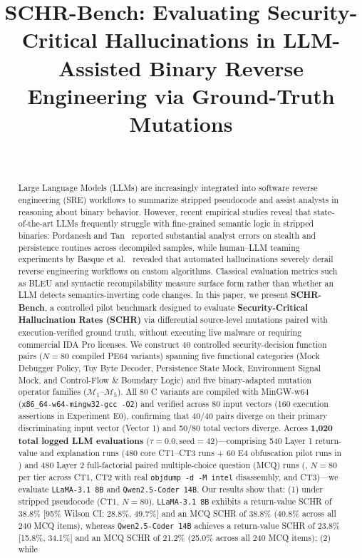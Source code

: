 \documentclass[conference]{IEEEtran}
\begin{document}
\title{SCHR-Bench: Evaluating Security-Critical Hallucinations in LLM-Assisted Binary Reverse Engineering via Ground-Truth Mutations}

\author{\\
}

\maketitle

\begin{abstract}
Large Language Models (LLMs) are increasingly integrated into software reverse engineering (SRE) workflows to summarize stripped pseudocode and assist analysts in reasoning about binary behavior. However, recent empirical studies reveal that state-of-the-art LLMs frequently struggle with fine-grained semantic logic in stripped binaries: Pordanesh and Tan~\cite{pordanesh2024exploring} reported substantial analyst errors on stealth and persistence routines across decompiled samples, while human--LLM teaming experiments by Basque et al.~\cite{basque2026decompiling} revealed that automated hallucinations severely derail reverse engineering workflows on custom algorithms. Classical evaluation metrics such as BLEU and syntactic recompilability measure surface form rather than whether an LLM detects semantics-inverting code changes. In this paper, we present \textbf{SCHR-Bench}, a controlled pilot benchmark designed to evaluate \textbf{Security-Critical Hallucination Rates (SCHR)} via differential source-level mutations paired with execution-verified ground truth, without executing live malware or requiring commercial IDA Pro licenses. We construct 40 controlled security-decision function pairs ($N = 80$ compiled PE64 variants) spanning five functional categories (Mock Debugger Policy, Toy Byte Decoder, Persistence State Mock, Environment Signal Mock, and Control-Flow \& Boundary Logic) and five binary-adapted mutation operator families ($\mathcal{M}_1$--$\mathcal{M}_5$). All 80 C variants are compiled with MinGW-w64 (\texttt{x86\_64-w64-mingw32-gcc -O2}) and verified across 80 input vectors (160 execution assertions in Experiment E0), confirming that 40/40 pairs diverge on their primary discriminating input vector (Vector 1) and 50/80 total vectors diverge. Across \textbf{1,020 total logged LLM evaluations} ($\tau = 0.0, \text{seed} = 42$)---comprising 540 Layer 1 return-value and explanation runs (480 core CT1--CT3 runs + 60 E4 obfuscation pilot runs in ) and 480 Layer 2 full-factorial paired multiple-choice question (MCQ) runs (, $N=80$ per tier across CT1, CT2 with real \texttt{objdump -d -M intel} disassembly, and CT3)---we evaluate \texttt{LLaMA-3.1 8B} and \texttt{Qwen2.5-Coder 14B}. Our results show that: (1) under stripped pseudocode (CT1, $N=80$), \texttt{LLaMA-3.1 8B} exhibits a return-value SCHR of 38.8\% [95\% Wilson CI: 28.8\%, 49.7\%] and an MCQ SCHR of 38.8\% (40.8\% across all 240 MCQ items), whereas \texttt{Qwen2.5-Coder 14B} achieves a return-value SCHR of 23.8\% [15.8\%, 34.1\%] and an MCQ SCHR of 21.2\% (25.0\% across all 240 MCQ items); (2) while 
\end{abstract}
\end{document}
